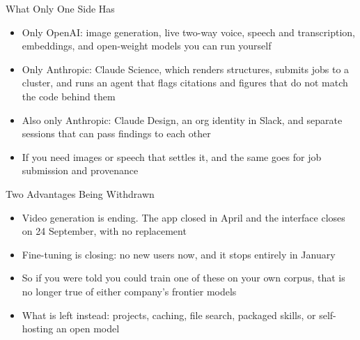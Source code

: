 \documentclass[aspectratio=169]{beamer}
\begin{document}
\begin{frame}{What Only One Side Has}
    \begin{itemize}\setlength{\itemsep}{6pt}
        \item Only OpenAI: image generation, live two-way voice, speech and transcription,
              embeddings, and open-weight models you can run yourself
        \item Only Anthropic: Claude Science, which renders structures, submits jobs to a
              cluster, and runs an agent that flags citations and figures that do not match
              the code behind them
        \item Also only Anthropic: Claude Design, an org identity in Slack, and separate
              sessions that can pass findings to each other
        \item If you need images or speech that settles it, and the same goes for job
              submission and provenance
    \end{itemize}
\end{frame}

\begin{frame}{Two Advantages Being Withdrawn}
    \begin{itemize}
        \item Video generation is ending. The app closed in April and the interface closes
              on 24 September, with no replacement
        \item Fine-tuning is closing: no new users now, and it stops entirely in January
        \item So if you were told you could train one of these on your own corpus, that is
              no longer true of either company's frontier models
        \item What is left instead: projects, caching, file search, packaged skills, or
              self-hosting an open model
    \end{itemize}
\end{frame}
\end{document}
